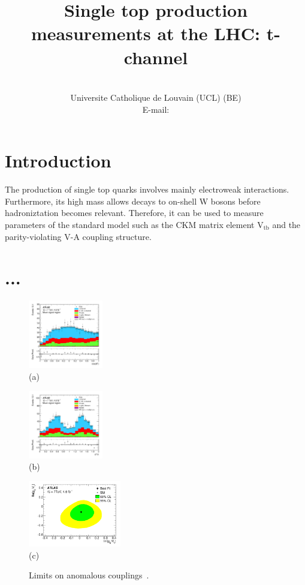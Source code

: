 \documentclass{PoS}
\title{Single top production measurements at the LHC: t-channel}
\author{
    \speaker{Matthias Komm}\\
    Universite Catholique de Louvain (UCL) (BE)\\
    E-mail: \email{Matthias.Komm@cern.ch}
}
\begin{document}
\section{Introduction}
The production of single top quarks involves mainly electroweak interactions. Furthermore, its high mass allows decays to on-shell W bosons before hadroniztation becomes relevant. Therefore, it can be used to measure parameters of the standard model such as the CKM matrix element $\mathrm{V_{tb}}$ and the parity-violating V-A coupling structure.

\section{...}
\begin{figure}[htbp]
\begin{center}
\parbox[t]{0.3\textwidth}{\centering\includegraphics[width=0.29\textwidth]{atlas_anomcoupl/theta.pdf}\\(a)}\parbox[t]{0.3\textwidth}{\centering\includegraphics[width=0.29\textwidth]{atlas_anomcoupl/phi.pdf}\\(b)}\parbox[t]{0.38\textwidth}{\centering\includegraphics[width=0.36\textwidth]{atlas_anomcoupl/limits.pdf}\\(c)}
\end{center}
\caption{Limits on anomalous couplings~\cite{atlas-anomcoupl}.}
\end{figure}
\end{document}
